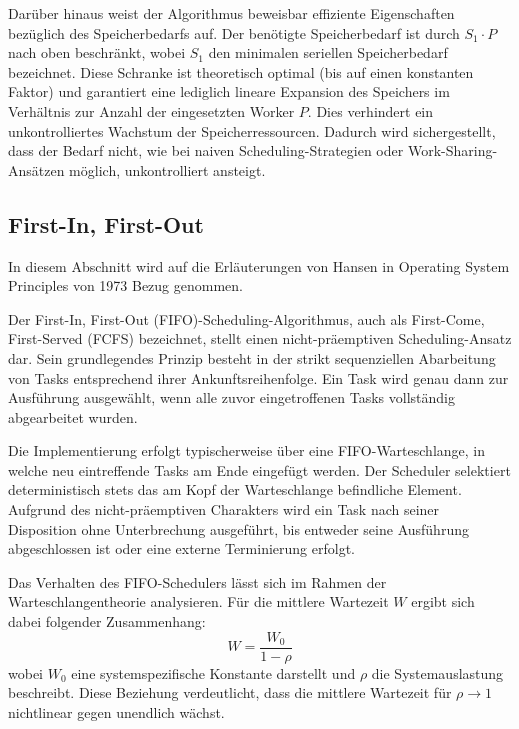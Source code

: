 \begin{sloppypar}
\vspace{7.56mm}

\noindent Darüber hinaus weist der Algorithmus beweisbar effiziente Eigenschaften bezüglich des Speicherbedarfs auf. 
Der benötigte Speicherbedarf ist durch $S_1 \cdot P$ nach oben beschränkt, wobei $S_1$ den minimalen seriellen Speicherbedarf bezeichnet. 
Diese Schranke ist theoretisch optimal (bis auf einen konstanten Faktor) und garantiert eine lediglich lineare Expansion des Speichers 
im Verhältnis zur Anzahl der eingesetzten Worker $P$. Dies verhindert ein unkontrolliertes Wachstum der Speicherressourcen. 
Dadurch wird sichergestellt, dass der Bedarf nicht, 
wie bei naiven Scheduling-Strategien oder Work-Sharing-Ansätzen möglich, unkontrolliert ansteigt.



\subsection{First-In, First-Out}

\noindent In diesem Abschnitt wird auf die Erläuterungen von Hansen in Operating System Principles von 1973 \cite{Hansen} Bezug genommen.

\vspace{7.56mm}

\noindent Der First-In, First-Out (\acs{FIFO})-Scheduling-Algorithmus, auch als First-Come, First-Served (\acs{FCFS}) bezeichnet, stellt einen nicht-präemptiven Scheduling-Ansatz dar.
Sein grundlegendes Prinzip besteht in der strikt sequenziellen Abarbeitung von Tasks entsprechend ihrer Ankunftsreihenfolge.
Ein Task wird genau dann zur Ausführung ausgewählt, wenn alle zuvor eingetroffenen Tasks vollständig abgearbeitet wurden.

\vspace{7.56mm}

\noindent Die Implementierung erfolgt typischerweise über eine \acs{FIFO}-Warteschlange, in welche neu eintreffende Tasks am Ende eingefügt werden.
Der Scheduler selektiert deterministisch stets das am Kopf der Warteschlange befindliche Element.
Aufgrund des nicht-präemptiven Charakters wird ein Task nach seiner Disposition ohne Unterbrechung ausgeführt, bis entweder seine Ausführung abgeschlossen ist oder eine externe Terminierung erfolgt.

\vspace{7.56mm}

\noindent Das Verhalten des \acs{FIFO}-Schedulers lässt sich im Rahmen der Warteschlangentheorie analysieren.
Für die mittlere Wartezeit $W$ ergibt sich dabei folgender Zusammenhang:
\begin{equation}
W = \frac{W_0}{1 - \rho}
\end{equation}
wobei $W_0$ eine systemspezifische Konstante darstellt und $\rho$ die Systemauslastung beschreibt.
Diese Beziehung verdeutlicht, dass die mittlere Wartezeit für $\rho \rightarrow 1$ nichtlinear gegen unendlich wächst.


\end{sloppypar}

